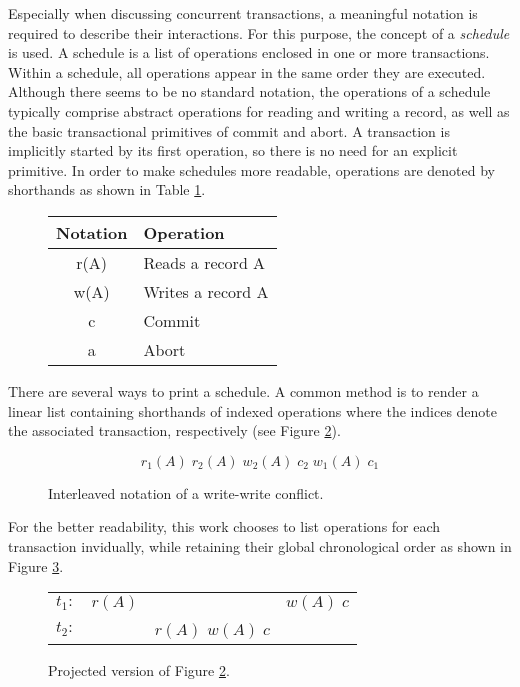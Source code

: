 Especially when discussing concurrent transactions, a meaningful notation is
required to describe their interactions. For this purpose, the concept of a
\emph{schedule} is used. A schedule is a list of operations enclosed in one or
more transactions. Within a schedule, all operations appear in the same order
they are executed. Although there seems to be no standard notation, the
operations of a schedule typically comprise abstract operations for reading and
writing a record, as well as the basic transactional primitives of commit and
abort. A transaction is implicitly started by its first operation, so there is
no need for an explicit primitive. In order to make schedules more readable,
operations are denoted by shorthands as shown in Table
\ref{tab:schedule_notation}.

\begin{figure}[h!]
    \centering
    \begin{tabular}{|c|l|}
        \hline
        \textbf{Notation} & \textbf{Operation}\\
        \hline
        r(A) & Reads a record A  \\ \hline
        w(A) & Writes a record A \\ \hline
        c    & Commit            \\ \hline
        a    & Abort             \\
        \hline
    \end{tabular}
    \caption{}
    \label{tab:schedule_notation}
\end{figure}

There are several ways to print a schedule. A common method is to render a
linear list containing shorthands of indexed operations where the indices denote
the associated transaction, respectively (see Figure
\ref{fig:schedule_interleaved}).

\begin{figure}[h!]
    \centering
    \[
        r_1(A)\; r_2(A)\; w_2(A)\; c_2\; w_1(A)\; c_1
    \]
    \caption{Interleaved notation of a write-write conflict.}
    \label{fig:schedule_interleaved}
\end{figure}

For the better readability, this work chooses to list operations for each transaction invidually, while retaining their global chronological order as shown in Figure \ref{fig:schedule_projected}.

\begin{figure}[h!]
    \centering
    \begin{tabular}{r c c c}
        $t_1:$ & $r(A)$ &                     & $w(A)\; c$ \\
        $t_2:$ &        & $r(A)$\; $w(A)\; c$ &            \\
    \end{tabular}
    \caption{Projected version of Figure \ref{fig:schedule_interleaved}.}
    \label{fig:schedule_projected}
\end{figure}

